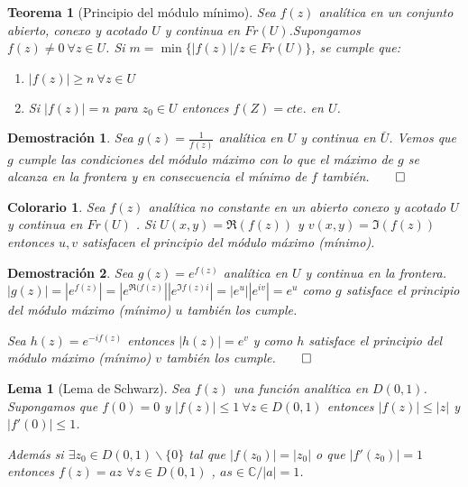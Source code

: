 \documentclass[10pt]{book}
\newtheorem{theorem}{Teorema}[chapter]
\newtheorem*{dem}{Demostración}
\newtheorem{col}{Colorario}[chapter]
\newtheorem{lema}{Lema}[chapter]
\newcommand{\C}{\mathbb{C}}
\begin{document}
\begin{theorem}[Principio del módulo mínimo]
Sea $f(z)$ analítica en un conjunto abierto, conexo y acotado $U$ y continua en $Fr(U)$.Supongamos $f(z)\neq 0\ \forall z\in U$. Si $m =\min \{|f(z)|/ z\in Fr(U)\}$, se cumple que:
\begin{enumerate}
\item $|f(z)|\geq n \ \forall z \in U$
\item Si $|f(z)| = n$ para $z_0 \in U$ entonces $f(Z) = cte.$ en $U$.
\end{enumerate}
\end{theorem}

\begin{dem}
Sea $g(z)= \frac{1}{f(z)}$ analítica en $U$ y continua en $\bar U$. Vemos que $g$ cumple las condiciones del módulo máximo con lo que el máximo de $g$ se alcanza en la frontera y en consecuencia el mínimo de $f$ también.$\qed$
\end{dem}

\begin{col}
Sea $f(z)$ analítica no constante en un abierto conexo y acotado $U$ y continua en $Fr(U)$ . Si $U(x,y) = \Re(f(z))$ y $v(x,y) = \Im(f(z))$ entonces $u,v$ satisfacen el principio del módulo máximo (mínimo).
\end{col}

\begin{dem}
Sea $g(z)= e^{f(z)}$ analítica en $U$ y continua en la frontera. $|g(z)| = |e^{f(z)}| = |e^{\Re(f(z)}||e^{\Im{f(z)}i}| = |e^u||e^{iv}| = e^u$ como $g$ satisface el principio del módulo máximo (mínimo) $u$ también los cumple.

Sea  $ h(z) = e^{-if(z)}$ entonces $|h(z)| = e^v$ y como $h$ satisface el principio del módulo máximo (mínimo) $v$ también los cumple.$\qed$
\end{dem}

\begin{lema}[Lema de Schwarz]
Sea $f(z)$ una función analítica en $D(0,1)$. Supongamos que $f(0)=0$ y $|f(z)|\leq 1\ \forall z \in D(0,1)$ entonces $|f(z)| \leq |z|$ y $|f'(0)| \leq 1$.

Además si $\exists z_0 \in D(0,1)\backslash \{0\}$ tal que $|f(z_0)| = |z_0|$ o que $|f'(z_0)| = 1$ entonces $f(z) = az$  $\forall z\in D(0,1)$ , $as \in \C/ |a|=1$.
\end{lema}
\end{document}
